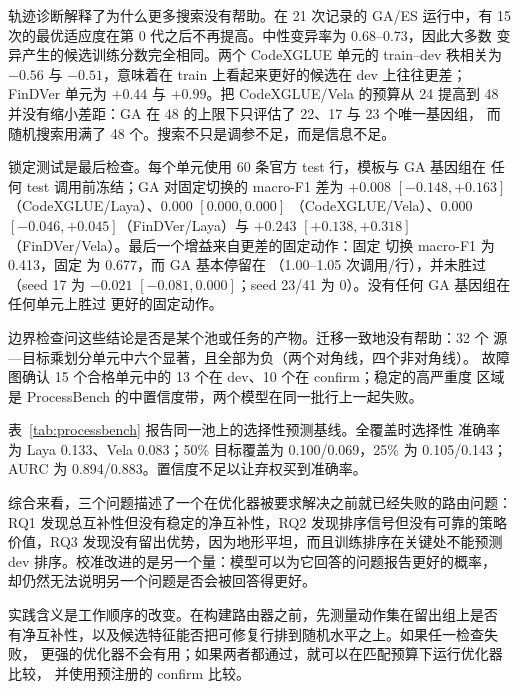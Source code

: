 

轨迹诊断解释了为什么更多搜索没有帮助。在 21 次记录的 GA/ES 运行中，有 15
次的最优适应度在第 0 代之后不再提高。中性变异率为 0.68--0.73，因此大多数
变异产生的候选训练分数完全相同。两个 CodeXGLUE 单元的 train--dev 秩相关为
$-0.56$ 与 $-0.51$，意味着在 train 上看起来更好的候选在 dev 上往往更差；
FinDVer 单元为 $+0.44$ 与 $+0.99$。把 CodeXGLUE/Vela 的预算从 24 提高到
48 并没有缩小差距：GA 在 48 的上限下只评估了 22、17 与 23 个唯一基因组，
而随机搜索用满了 48 个。搜索不只是调参不足，而是信息不足。

锁定测试是最后检查。每个单元使用 60 条官方 test 行，模板与 GA 基因组在
任何 test 调用前冻结；GA 对固定切换的 macro-F1 差为 $+0.008$
$[-0.148,+0.163]$（CodeXGLUE/Laya）、$0.000$ $[0.000,0.000]$
（CodeXGLUE/Vela）、$0.000$ $[-0.046,+0.045]$（FinDVer/Laya）与 $+0.243$
$[+0.138,+0.318]$（FinDVer/Vela）。最后一个增益来自更差的固定动作：固定
切换 macro-F1 为 0.413，固定 \noul{} 为 0.677，而 GA 基本停留在 \noul{}
（1.00--1.05 次调用/行），并未胜过 \noul{}（seed 17 为 $-0.021$
$[-0.081,0.000]$；seed 23/41 为 0）。没有任何 GA 基因组在任何单元上胜过
更好的固定动作。

边界检查问这些结论是否是某个池或任务的产物。迁移一致地没有帮助：32 个
源—目标乘划分单元中六个显著，且全部为负（两个对角线，四个非对角线）。
故障图确认 15 个合格单元中的 13 个在 dev、10 个在 confirm；稳定的高严重度
区域是 ProcessBench 的中置信度带，两个模型在同一批行上一起失败。

表~\ref{tab:processbench} 报告同一池上的选择性预测基线。全覆盖时选择性
准确率为 Laya 0.133、Vela 0.083；50\% 目标覆盖为 0.100/0.069，25\% 为
0.105/0.143；AURC 为 0.894/0.883。置信度不足以让弃权买到准确率。



综合来看，三个问题描述了一个在优化器被要求解决之前就已经失败的路由问题：
RQ1 发现总互补性但没有稳定的净互补性，RQ2 发现排序信号但没有可靠的策略
价值，RQ3 发现没有留出优势，因为地形平坦，而且训练排序在关键处不能预测
dev 排序。校准改进的是另一个量：模型可以为它回答的问题报告更好的概率，
却仍然无法说明另一个问题是否会被回答得更好。

实践含义是工作顺序的改变。在构建路由器之前，先测量动作集在留出组上是否
有净互补性，以及候选特征能否把可修复行排到随机水平之上。如果任一检查失败，
更强的优化器不会有用；如果两者都通过，就可以在匹配预算下运行优化器比较，
并使用预注册的 confirm 比较。
